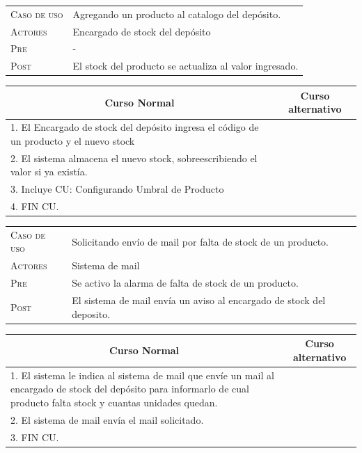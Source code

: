\newpage

\begin{tabular}{p{} p{}}
    \textsc{Caso de uso} & Agregando un producto al catalogo del depósito. \\
    \textsc{Actores} & Encargado de stock del depósito \\
    \textsc{Pre} & -\\
    \textsc{Post} & El stock del producto se actualiza al valor ingresado. \\
\end{tabular}

\begin{center}
\begin{tabular}{|p{}|p{}|}
    \hline
    \multicolumn{1}{|c|}{Curso Normal} &
    \multicolumn{1}{|c|}{Curso alternativo} \\
    \hline
    1. El Encargado de stock del depósito ingresa el código de un producto y el nuevo stock & \\
    2. El sistema almacena el nuevo stock, sobreescribiendo el valor si ya existía. &
    \\
    3. Incluye CU: Configurando Umbral de Producto & \\
    4. FIN CU. & \\
    \hline
\end{tabular}
\end{center}

\begin{tabular}{p{} p{}}
    \textsc{Caso de uso} & Solicitando envío de mail por falta de stock de un producto. \\
    \textsc{Actores} & Sistema de mail \\
    \textsc{Pre} & Se activo la alarma de falta de stock de un producto. \\
    \textsc{Post} & El sistema de mail envía un aviso al encargado de stock del deposito. \\
\end{tabular}

\begin{center}
\begin{tabular}{|p{}|p{}|}
    \hline
    \multicolumn{1}{|c|}{Curso Normal} &
    \multicolumn{1}{|c|}{Curso alternativo} \\
    \hline
    1. El sistema le indica al sistema de mail que envíe un mail al encargado de stock del depósito para informarlo de cual producto falta stock y cuantas unidades quedan. & \\
    2. El sistema de mail envía el mail solicitado. & \\
	3. FIN CU. & \\
    \hline
\end{tabular}
\end{center}


